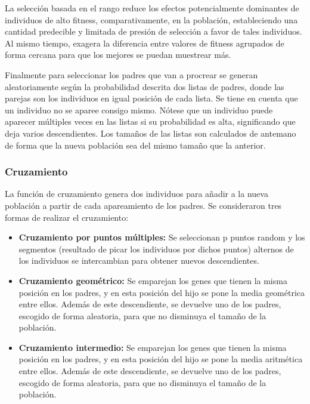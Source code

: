 \documentclass[colorinlistoftodos,twoside,twocolumn]{article} %
\begin{document}
	La selección basada en el rango reduce los efectos potencialmente dominantes de individuos de alto fitness, comparativamente, en la población, estableciendo una cantidad predecible y limitada de presión de selección a favor de tales individuos. Al mismo tiempo, exagera la diferencia entre valores de fitness agrupados de forma cercana para que los mejores se puedan muestrear más.
	
	Finalmente para seleccionar los padres que van a procrear se generan aleatoriamente seg\'un la probabilidad descrita dos listas de padres, donde las parejas son los individuos en igual posici\'on de cada lista. Se tiene en cuenta que un individuo no se aparee consigo mismo. N\'otese que un individuo puede aparecer m\'ultiples veces en las listas si su probabilidad es alta, significando que deja varios descendientes. Los tama\~nos de las listas son calculados de antemano de forma que la nueva poblaci\'on sea del mismo tama\~no que la anterior.
	
	\subsubsection{Cruzamiento}
	
	La funci\'on de cruzamiento genera dos individuos para a\~nadir a la nueva poblaci\'on a partir de cada apareamiento de los padres. Se consideraron tres formas de realizar el cruzamiento:
	\begin{itemize}
		\item  \textbf{Cruzamiento por puntos m\'ultiples:} Se seleccionan p puntos random y los segmentos (resultado de picar los individuos por dichos puntos) alternos de los individuos se intercambian para obtener nuevos descendientes.
		\item \textbf{Cruzamiento geom\'etrico:} Se emparejan los genes que tienen la misma posici\'on en los padres, y en esta posici\'on del hijo se pone la media geom\'etrica entre ellos. Adem\'as de este descendiente, se devuelve uno de los padres, escogido de forma aleatoria, para que no disminuya el tama\~no de la poblaci\'on. 
		\item \textbf{Cruzamiento intermedio:} Se emparejan los genes que tienen la misma posici\'on en los padres, y en esta posici\'on del hijo se pone la media aritm\'etica entre ellos. Adem\'as de este descendiente, se devuelve uno de los padres, escogido de forma aleatoria, para que no disminuya el tama\~no de la poblaci\'on. 
	\end{itemize}
	
\end{document}
